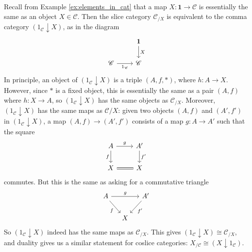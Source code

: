 \documentclass[10pt,oneside]{book}
\def\~#1{\mathscr{#1}}
\theoremstyle{plain}
\theoremstyle{definition}
\theoremstyle{remark}
\numberwithin{equation}{section}
\numberwithin{figure}{section}
\begin{document}
Recall from Example \ref{ex:elements_in_cat} that a map $X: \mathbf{1} \to \~C$ is essentially the same as an object $X \in \~C$. Then the slice category $\~C_{/X}$ is equivalent to the comma category $(1_\~C \downarrow X)$, as in the diagram
    \[\begin{tikzcd}
    & {\mathbf{1}} \\
    {\~C} & {\~C}
    \arrow["{X}", from=1-2, to=2-2]
    \arrow["{1_{\~C}}"', from=2-1, to=2-2]
\end{tikzcd}\]
In principle, an object of $(1_\~C \downarrow X)$ is  a triple $(A, f, \ast)$, where $h: A \to X$. However, since $\ast$ is a fixed object, this is essentially the same as a pair $(A, f)$ where $h: X \to A$, so $(1_{\~C} \downarrow X)$ has the same objects as $\~C_{/X}$. Moreover, $(1_{\~C} \downarrow X)$ has the same maps as $\~C/X$: given two objects $(A, f)$ and $(A', f')$ in $(1_\~C \downarrow X)$, a map $(A, f) \to (A', f')$ consists of a map $g: A \to A'$ such that the square
\[\begin{tikzcd}
    A & {A'} \\
    X & X
    \arrow["g", from=1-1, to=1-2]
    \arrow["f"', from=1-1, to=2-1]
    \arrow["{f'}", from=1-2, to=2-2]
    \arrow[Rightarrow, no head, from=2-1, to=2-2]
\end{tikzcd}\]
commutes. But this is the same as asking for a commutative triangle 
\[\begin{tikzcd}[column sep=small] 
            A \arrow[dr, "f", swap] \arrow[rr, "g"]
            & & A' \arrow[dl, "f'"] \\
            & X
        \end{tikzcd}\]
So $(1_{\~C} \downarrow X)$ indeed has the same maps as $\~C_{/X}$. This gives $(1_{\~C} \downarrow X) \cong \~C_{/X}$, and duality gives us a similar statement for coslice categories: $X_{/\~C} \cong (X \downarrow 1_{\~C})$.
\end{document}
